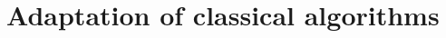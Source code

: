\documentclass[10pt,a4paper,pdf]{beamer}
\renewcommand{\t}[1]{\text{#1}}
\begin{document}
\section{Adaptation of classical algorithms}
%
%
%
%			
%				
%                                              
%        
%									
%
%
%			
%				
%                                              
%        
%									
%
\end{document}
